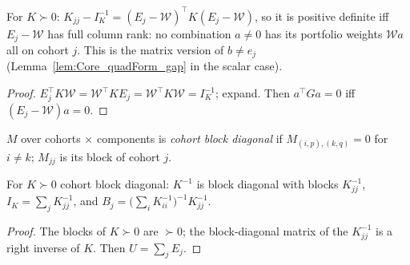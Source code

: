 \begin{theorem}\label{thm:CV_gap_posDef}
  \leanok
  For $K \succ 0$: $K_{jj} - I_K^{-1} = (E_j - \mathcal W)^\top K (E_j - \mathcal W)$, so it is
  positive definite iff $E_j - \mathcal W$ has full column rank: no combination $a \ne 0$ has
  its portfolio weights $\mathcal W a$ all on cohort $j$. This is the matrix version of
  $b \ne e_j$ (Lemma~\ref{lem:Core_quadForm_gap} in the scalar case).
\end{theorem}
\begin{proof}
  \leanok
  $E_j^\top K\mathcal W = \mathcal W^\top K E_j = \mathcal W^\top K\mathcal W = I_K^{-1}$;
  expand. Then $a^\top G a = 0$ iff $(E_j - \mathcal W)a = 0$.
\end{proof}

\begin{definition}\label{def:CV_blockDiag}
  \leanok
  $M$ over cohorts $\times$ components is \emph{cohort block diagonal} if
  $M_{(i,p),(k,q)} = 0$ for $i \ne k$; $M_{jj}$ is its block of cohort $j$.
\end{definition}

\begin{lemma}\label{lem:CV_blockDiag}
  \leanok
  For $K \succ 0$ cohort block diagonal: $K^{-1}$ is block diagonal with blocks
  $K_{jj}^{-1}$, $I_K = \sum_j K_{jj}^{-1}$, and
  $B_j = \bigl(\sum_i K_{ii}^{-1}\bigr)^{-1} K_{jj}^{-1}$.
\end{lemma}
\begin{proof}
  \leanok
  The blocks of $K \succ 0$ are $\succ 0$; the block-diagonal matrix of the $K_{jj}^{-1}$ is a
  right inverse of $K$. Then $U = \sum_j E_j$.
\end{proof}


